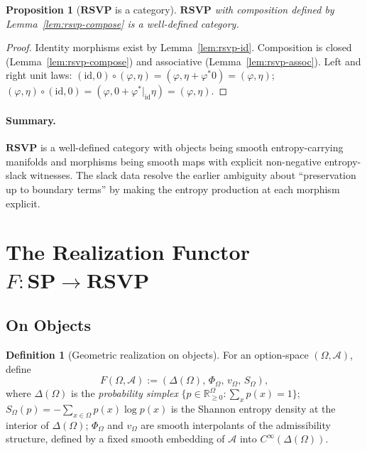 \documentclass[12pt,a4paper]{article}
\newtheorem{proposition}[theorem]{Proposition}
\theoremstyle{definition}
\newtheorem{definition}[theorem]{Definition}
\theoremstyle{remark}
\newcommand{\Rnn}{\mathbb{R}_{\ge 0}}
\newcommand{\SP}{\mathbf{SP}}
\newcommand{\RSVP}{\mathbf{RSVP}}
\newcommand{\id}{\mathrm{id}}
\newcommand{\PhiF}{\Phi}
\newcommand{\vF}{v}
\newcommand{\SF}{S}
\begin{document}
\begin{proposition}[$\RSVP$ is a category]
\label{prop:rsvp-cat}
$\RSVP$ with composition defined by Lemma~\ref{lem:rsvp-compose} is a well-defined
category.
\end{proposition}

\begin{proof}
Identity morphisms exist by Lemma~\ref{lem:rsvp-id}. Composition is closed
(Lemma~\ref{lem:rsvp-compose}) and associative (Lemma~\ref{lem:rsvp-assoc}).
Left and right unit laws: $(\id,0)\circ(\varphi,\eta)=(\varphi,\eta+\varphi^*0)
=(\varphi,\eta)$; $(\varphi,\eta)\circ(\id,0)=(\varphi,0+\varphi^*|_{\id}\eta)
=(\varphi,\eta)$.
\end{proof}

\paragraph{Summary.} $\RSVP$ is a well-defined category with objects being smooth
entropy-carrying manifolds and morphisms being smooth maps with explicit non-negative
entropy-slack witnesses. The slack data resolve the earlier ambiguity about
``preservation up to boundary terms'' by making the entropy production at each
morphism explicit.

\section{The Realization Functor \texorpdfstring{$F:\SP\to\RSVP$}{F}}
\label{sec:functor}

\subsection{On Objects}

\begin{definition}[Geometric realization on objects]
\label{def:F-objects}
For an option-space $(\Omega,\mathcal{A})$, define
\[
  F(\Omega,\mathcal{A}) := (\Delta(\Omega),\,\PhiF_\Omega,\,\vF_\Omega,\,\SF_\Omega),
\]
where $\Delta(\Omega)$ is the \emph{probability simplex} $\{p\in\Rnn^\Omega:\sum_x p(x)=1\}$;
$\SF_\Omega(p)=-\sum_{x\in\Omega}p(x)\log p(x)$ is the Shannon entropy density at
the interior of $\Delta(\Omega)$; $\PhiF_\Omega$ and $\vF_\Omega$ are smooth
interpolants of the admissibility structure, defined by a fixed smooth embedding
of $\mathcal{A}$ into $C^\infty(\Delta(\Omega))$.
\end{definition}
\end{document}
